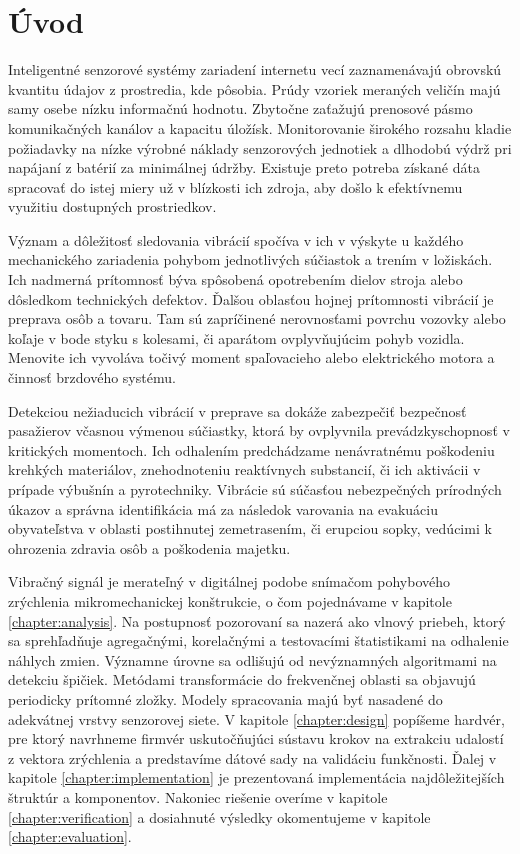 \chapter{Úvod}
Inteligentné senzorové systémy zariadení internetu vecí zaznamenávajú obrovskú kvantitu údajov z prostredia, kde
pôsobia. Prúdy vzoriek meraných veličín majú samy osebe nízku informačnú hodnotu. Zbytočne zaťažujú
prenosové pásmo komunikačných kanálov a kapacitu úložísk. Monitorovanie širokého rozsahu kladie požiadavky
na nízke výrobné náklady senzorových jednotiek a dlhodobú výdrž pri napájaní z batérií za minimálnej údržby.
Existuje preto potreba získané dáta spracovať do istej miery už v blízkosti ich zdroja, aby došlo k efektívnemu
využitiu dostupných prostriedkov.

Význam a dôležitosť sledovania vibrácií spočíva v ich v výskyte u každého mechanického zariadenia pohybom jednotlivých súčiastok
a trením v ložiskách. Ich nadmerná prítomnosť býva spôsobená opotrebením dielov stroja alebo dôsledkom technických defektov. 
Ďalšou oblasťou hojnej prítomnosti vibrácií je preprava osôb a tovaru. Tam sú zapríčinené nerovnosťami povrchu vozovky 
alebo koľaje v bode styku s kolesami, či aparátom ovplyvňujúcim pohyb vozidla. Menovite ich vyvoláva točivý moment 
spaľovacieho alebo elektrického motora a činnosť brzdového systému.

Detekciou nežiaducich vibrácií v preprave sa dokáže zabezpečiť bezpečnosť pasažierov včasnou výmenou súčiastky,
ktorá by ovplyvnila prevádzkyschopnosť v kritických momentoch. Ich odhalením predchádzame nenávratnému poškodeniu krehkých materiálov,
znehodnoteniu reaktívnych substancií, či ich aktivácii v prípade výbušnín a pyrotechniky. Vibrácie sú súčasťou
nebezpečných prírodných úkazov a správna identifikácia má za následok varovania na evakuáciu obyvateľstva
v oblasti postihnutej zemetrasením, či erupciou sopky, vedúcimi k ohrozenia zdravia osôb a poškodenia majetku.

Vibračný signál je merateľný v digitálnej podobe snímačom pohybového zrýchlenia mikromechanickej konštrukcie, o čom
pojednávame v kapitole \ref{chapter:analysis}. Na postupnosť pozorovaní sa nazerá ako vlnový priebeh, 
ktorý sa sprehľadňuje agregačnými, korelačnými a testovacími štatistikami na odhalenie náhlych zmien. 
Významne úrovne sa odlišujú od nevýznamných algoritmami na detekciu špičiek. Metódami transformácie do frekvenčnej oblasti
sa objavujú periodicky prítomné zložky. Modely spracovania majú byť nasadené do adekvátnej vrstvy senzorovej siete. 
V kapitole \ref{chapter:design} popíšeme hardvér, pre ktorý navrhneme firmvér uskutočňujúci sústavu
krokov na extrakciu udalostí z vektora zrýchlenia a predstavíme dátové sady na validáciu funkčnosti.
Ďalej v kapitole \ref{chapter:implementation} je prezentovaná implementácia najdôležitejších štruktúr a komponentov. Nakoniec
riešenie overíme v kapitole \ref{chapter:verification} a dosiahnuté výsledky okomentujeme v kapitole \ref{chapter:evaluation}. 

  
